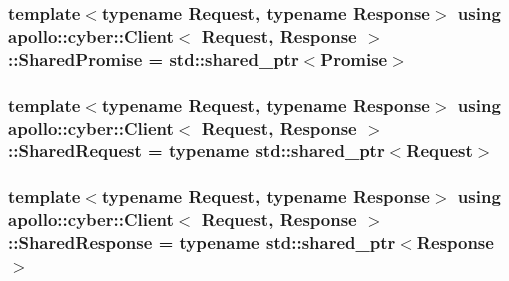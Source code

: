 \hypertarget{classapollo_1_1cyber_1_1Client_aefa3f85f666c6495bdf92c1bacb36802}{
\subsubsection[{Shared\-Promise}]{\setlength{\rightskip}{0pt plus 5cm}template$<$typename Request, typename Response$>$ using {\bf apollo\-::cyber\-::\-Client}$<$ Request, Response $>$\-::{\bf Shared\-Promise} =  std\-::shared\-\_\-ptr$<${\bf Promise}$>$}}\label{classapollo_1_1cyber_1_1Client_aefa3f85f666c6495bdf92c1bacb36802}
\hypertarget{classapollo_1_1cyber_1_1Client_ac30a67b1a2c1b6d37963968172c290a5}{
\subsubsection[{Shared\-Request}]{\setlength{\rightskip}{0pt plus 5cm}template$<$typename Request, typename Response$>$ using {\bf apollo\-::cyber\-::\-Client}$<$ Request, Response $>$\-::{\bf Shared\-Request} =  typename std\-::shared\-\_\-ptr$<$Request$>$}}\label{classapollo_1_1cyber_1_1Client_ac30a67b1a2c1b6d37963968172c290a5}
\hypertarget{classapollo_1_1cyber_1_1Client_af6198651a41ac3ed1b8c4c4bdb31bc71}{
\subsubsection[{Shared\-Response}]{\setlength{\rightskip}{0pt plus 5cm}template$<$typename Request, typename Response$>$ using {\bf apollo\-::cyber\-::\-Client}$<$ Request, Response $>$\-::{\bf Shared\-Response} =  typename std\-::shared\-\_\-ptr$<$Response$>$}}\label{classapollo_1_1cyber_1_1Client_af6198651a41ac3ed1b8c4c4bdb31bc71}



